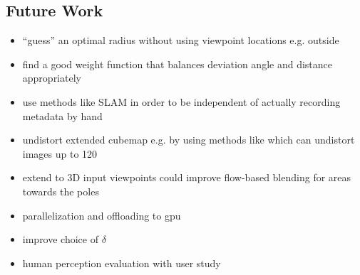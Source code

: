 \subsection{Future Work}
\begin{itemize}
  \item ``guess'' an optimal radius without using viewpoint locations e.g. outside
  \item find a good weight function that balances deviation angle and distance appropriately
  \item use methods like SLAM in order to be independent of actually recording metadata by hand
  \item undistort extended cubemap e.g. by using methods like \cite{fov} which can undistort images up to 120\degree
  \item extend to 3D \ar input viewpoints could improve flow-based blending for areas towards the poles
  \item parallelization and offloading to gpu
  \item improve choice of $\delta$
  \item human perception evaluation with user study
\end{itemize}

